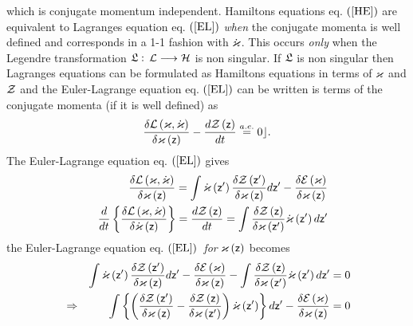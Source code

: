 which is conjugate momentum independent. Hamiltons equations eq. $\left( \ref%
{HE}\right) $ are equivalent to Lagranges equation eq. $\left( \ref{EL}%
\right) $ {\em when} the conjugate momenta is well defined and corresponds
in a 1-1 fashion with ${\cal \dot{\varkappa}}$. This occurs {\em only} when
the Legendre transformation ${\frak L}:$ ${\cal L\longrightarrow H}$ is non
singular. If ${\frak L}$ is non singular then Lagranges equations can be
formulated as Hamiltons equations in terms of ${\cal \varkappa }$ and ${\cal %
Z}$ and the Euler-Lagrange equation eq. $\left( \ref{EL}\right) $ can be
written is terms of the conjugate momenta (if it is well defined) as 
\begin{equation}
\frac{\delta {\cal L}\left( {\cal \varkappa },{\cal \dot{\varkappa}}\right) 
}{\delta {\cal \varkappa }\left( {\sf z}\right) }-\frac{d{\cal Z\left( {\sf z%
}\right) }}{dt}\stackrel{a.e.}{=}0\rfloor .
\end{equation}%
The Euler-Lagrange equation eq. $\left( \ref{EL}\right) $ gives 
\begin{eqnarray}
&&\frac{\delta {\cal L}\left( {\cal \varkappa },{\cal \dot{\varkappa}}%
\right) }{\delta {\cal \varkappa }\left( {\sf z}\right) }=\int {\cal \dot{%
\varkappa}}\left( {\sf z}^{\prime }\right) \frac{\delta {\cal Z}\left( {\sf z%
}^{\prime }\right) }{\delta {\cal \varkappa }\left( {\sf z}\right) }d{\sf z}%
^{\prime }-\frac{\delta {\cal E}\left( {\cal \varkappa }\right) }{\delta 
{\cal \varkappa }\left( {\sf z}\right) } \\
&&\frac{d}{dt}\left\{ \frac{\delta {\cal L}\left( {\cal \varkappa },{\cal 
\dot{\varkappa}}\right) }{\delta {\cal \dot{\varkappa}}\left( {\sf z}\right) 
}\right\} =\frac{d{\cal Z}\left( {\sf z}\right) }{dt}=\int \frac{\delta 
{\cal Z}\left( {\sf z}\right) }{\delta {\cal \varkappa }\left( {\sf z}%
^{\prime }\right) }{\cal \dot{\varkappa}}\left( {\sf z}^{\prime }\right) d%
{\sf z}^{\prime }
\end{eqnarray}%
the Euler-Lagrange equation eq. $\left( \ref{EL}\right) ${\em \ for} ${\cal %
\varkappa }\left( {\sf z}\right) $ becomes 
\begin{eqnarray}
&&\int {\cal \dot{\varkappa}}\left( {\sf z}^{\prime }\right) \frac{\delta 
{\cal Z}\left( {\sf z}^{\prime }\right) }{\delta {\cal \varkappa }\left( 
{\sf z}\right) }d{\sf z}^{\prime }-\frac{\delta {\cal E}\left( {\cal %
\varkappa }\right) }{\delta {\cal \varkappa }\left( {\sf z}\right) }-\int 
\frac{\delta {\cal Z}\left( {\sf z}\right) }{\delta {\cal \varkappa }\left( 
{\sf z}^{\prime }\right) }{\cal \dot{\varkappa}}\left( {\sf z}^{\prime
}\right) d{\sf z}^{\prime }=0 \\
&\Rightarrow &\int \left\{ \left( \frac{\delta {\cal Z}\left( {\sf z}%
^{\prime }\right) }{\delta {\cal \varkappa }\left( {\sf z}\right) }-\frac{%
\delta {\cal Z}\left( {\sf z}\right) }{\delta {\cal \varkappa }\left( {\sf z}%
^{\prime }\right) }\right) {\cal \dot{\varkappa}}\left( {\sf z}^{\prime
}\right) \right\} d{\sf z}^{\prime }-\frac{\delta {\cal E}\left( {\cal %
\varkappa }\right) }{\delta {\cal \varkappa }\left( {\sf z}\right) }=0
\end{eqnarray}%
